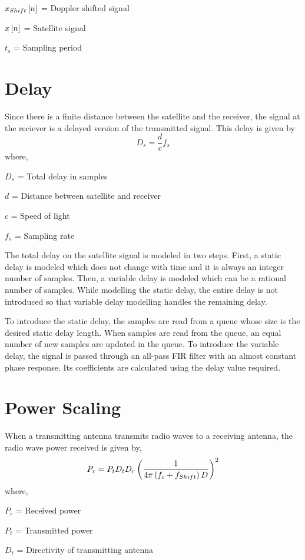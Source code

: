 \documentclass[10pt]{book}
\begin{document}
$x_{Shift}{}\left[n\right]$ = Doppler shifted signal

$x{}\left[n\right]$ = Satellite signal

$t_{s}$ = Sampling period

\section{Delay}
Since there is a finite distance between the satellite and the receiver, the signal at the reciever is a delayed version of the transmitted signal. This delay is given by
\begin{equation}
    D_{s} = \frac{d}{c}f_{s} 
\end{equation}
where,

$D_{s}$ = Total delay in samples

$d$ = Distance between satellite and receiver

$c$ = Speed of light

$f_{s}$ = Sampling rate

The total delay on the satellite signal is modeled in two steps. First, a static delay is modeled which does not change with time and it is always an integer number of samples. Then, %
a variable delay is modeled which can be a rational number of samples. While modelling the static delay, the entire delay is not introduced so that variable delay modelling handles the remaining %
delay.

To introduce the static delay, the samples are read from a queue whose size is the desired static delay length. When samples are read from the queue, an equal number of new samples are %
updated in the queue. To introduce the variable delay, the signal is passed through an all-pass FIR filter with an almost constant phase response. Its coefficients are calculated %
using the delay value required.

\section{Power Scaling}
When a transmitting antenna transmits radio waves to a receiving antenna, the radio wave power received is given by,
\begin{equation}
    P_r = P_t D_t D_r \left(\frac{1}{4 \pi \left(f_c + f_{Shift}\right) D}\right)^2
\end{equation}
where,

$P_r$ = Received power

$P_t$ = Transmitted power

$D_t$ = Directivity of transmitting antenna 
\end{document}
